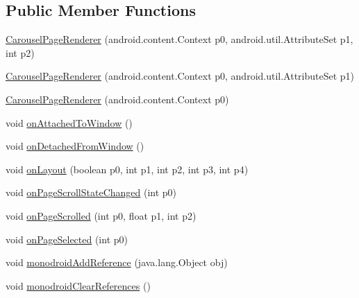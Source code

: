 \subsection*{Public Member Functions}
\begin{CompactItemize}
\item 
\hyperlink{classmd5270abb39e60627f0f200893b490a1ade_1_1_carousel_page_renderer_6acde7f90db116b76b108b2bd1fb0b64}{CarouselPageRenderer} (android.content.Context p0, android.util.AttributeSet p1, int p2)
\item 
\hyperlink{classmd5270abb39e60627f0f200893b490a1ade_1_1_carousel_page_renderer_f27701b1f80e7c9f9a2d586417747524}{CarouselPageRenderer} (android.content.Context p0, android.util.AttributeSet p1)
\item 
\hyperlink{classmd5270abb39e60627f0f200893b490a1ade_1_1_carousel_page_renderer_a9be454657ef82dbb21b8c50844607c8}{CarouselPageRenderer} (android.content.Context p0)
\item 
void \hyperlink{classmd5270abb39e60627f0f200893b490a1ade_1_1_carousel_page_renderer_bd56e6e003b938a7010f08820710a67f}{onAttachedToWindow} ()
\item 
void \hyperlink{classmd5270abb39e60627f0f200893b490a1ade_1_1_carousel_page_renderer_5f3c611e0c723d2ad1f8b55091798202}{onDetachedFromWindow} ()
\item 
void \hyperlink{classmd5270abb39e60627f0f200893b490a1ade_1_1_carousel_page_renderer_078976cb18c541b71fc96248ccd767e6}{onLayout} (boolean p0, int p1, int p2, int p3, int p4)
\item 
void \hyperlink{classmd5270abb39e60627f0f200893b490a1ade_1_1_carousel_page_renderer_99b77538c0fbbfb488645c55e676c438}{onPageScrollStateChanged} (int p0)
\item 
void \hyperlink{classmd5270abb39e60627f0f200893b490a1ade_1_1_carousel_page_renderer_be81b3e31f566f0d59f1a198578b3541}{onPageScrolled} (int p0, float p1, int p2)
\item 
void \hyperlink{classmd5270abb39e60627f0f200893b490a1ade_1_1_carousel_page_renderer_a3c0ad81abb02d7454b2ceed0de08148}{onPageSelected} (int p0)
\item 
void \hyperlink{classmd5270abb39e60627f0f200893b490a1ade_1_1_carousel_page_renderer_26e779e0778b3b8b22f6f7a8e20f1e7e}{monodroidAddReference} (java.lang.Object obj)
\item 
void \hyperlink{classmd5270abb39e60627f0f200893b490a1ade_1_1_carousel_page_renderer_7f418b0c33eb2a6154244df3ce1ab3d0}{monodroidClearReferences} ()
\end{CompactItemize}
